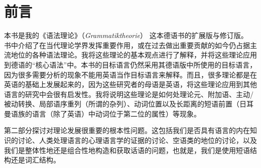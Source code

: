 \chapter{前言}

\largerpage[-1]
本书是我的《语法理论》（\emph{Grammatiktheorie}） \citep{MuellerGTBuch2}这本德语书的扩展版与修订版。
书中介绍了在当代理论学界发挥重要作用，或在过去做出重要贡献的如今仍占据主流地位的各种语法理论。我将这些理论的基本观点进行了解释，并将这些理论应用到德语的“核心语法”中。本书的目标语言仍然采用其德语版中所使用的目标语言，因为很多需要分析的现象不能用英语当作目标语言来解释。而且，很多理论都是在英语的基础上发展起来的，因为这些研究者的母语是英语，将这些理论应用到其他语言的研究中会很有启发性。我将说明这些理论是如何处理论元、附加语、主动/被动转换、局部语序重列（所谓的杂列）、动词位置以及长距离的短语前置（日耳曼语族的语言（除了英语）中动词位于第二位的属性）等现象。

第二部分探讨对理论发展很重要的根本性问题。这包括我们是否具有语言的内在知识的讨论、人类处理语言的心理语言学的证据的讨论、空语类的地位的讨论，以及我们是整体性地还是组合性地构造和获取话语的问题，也就是，我们是使用短语结构还是词汇结构。

